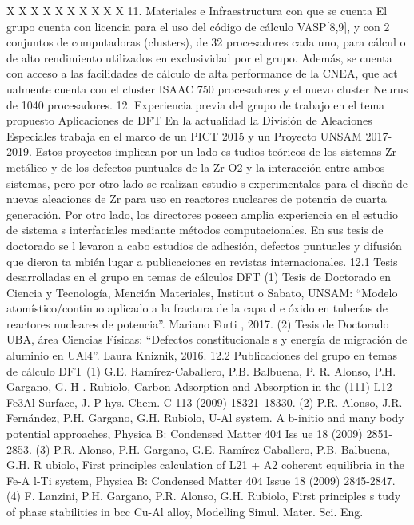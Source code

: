 X
X
X
X
X
X
X
X
X
X
11. Materiales e Infraestructura con que se cuenta 
El grupo cuenta con licencia para el uso del código de cálculo VASP[8,9], y con 
2 conjuntos de computadoras (clusters), de 32 procesadores cada uno, para cálcul
o de alto rendimiento utilizados en exclusividad por el grupo. Además, se cuenta
 con acceso a las facilidades de cálculo de alta performance de la CNEA, que act
ualmente cuenta con el cluster ISAAC 750 procesadores y el nuevo cluster Neurus 
de 1040 procesadores.
12. Experiencia previa del grupo de trabajo en el tema propuesto Aplicaciones de
 DFT
En la actualidad la División de Aleaciones Especiales trabaja en el marco de un 
PICT 2015 y un Proyecto UNSAM 2017-2019. Estos proyectos implican por un lado es
tudios teóricos de los sistemas Zr metálico y de los defectos puntuales de la Zr
O2 y la interacción entre ambos sistemas, pero por otro lado se realizan estudio
s experimentales para el diseño de nuevas aleaciones de Zr para uso en reactores
 nucleares de potencia de cuarta generación. 
Por otro lado, los directores poseen amplia experiencia en el estudio de sistema
s interfaciales mediante métodos computacionales. En sus tesis de doctorado se l
levaron a cabo estudios de adhesión, defectos puntuales y difusión que dieron ta
mbién lugar a publicaciones en revistas internacionales. 
12.1  Tesis desarrolladas en el grupo en temas de cálculos DFT
    (1) Tesis de Doctorado en Ciencia y Tecnología, Mención Materiales, Institut
o Sabato, UNSAM: “Modelo atomístico/continuo aplicado a la fractura de la capa d
e óxido en tuberías de reactores nucleares de potencia”. Mariano Forti , 2017.
    (2) Tesis de Doctorado UBA, área Ciencias Físicas: “Defectos constitucionale
s y energía de migración de aluminio en UAl4”. Laura Kniznik, 2016. 
12.2  Publicaciones del grupo en temas de cálculo DFT
    (1)  G.E. Ramírez-Caballero, P.B. Balbuena, P. R. Alonso, P.H. Gargano, G. H
. Rubiolo, Carbon Adsorption and Absorption in the (111) L12 Fe3Al Surface, J. P
hys. Chem. C 113 (2009) 18321–18330.
    (2)  P.R. Alonso, J.R. Fernández, P.H. Gargano, G.H. Rubiolo, U-Al system. A
b-initio and many body potential approaches, Physica B: Condensed Matter 404 Iss
ue 18 (2009) 2851-2853.
    (3) P.R. Alonso, P.H. Gargano, G.E. Ramírez-Caballero, P.B. Balbuena, G.H. R
ubiolo, First principles calculation of L21 + A2 coherent equilibria in the Fe-A
l-Ti system, Physica B: Condensed Matter 404 Issue 18 (2009) 2845-2847. 
    (4)  F. Lanzini, P.H. Gargano, P.R. Alonso, G.H. Rubiolo, First principles s
tudy of phase stabilities in bcc Cu-Al alloy, Modelling Simul. Mater. Sci. Eng. 
